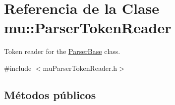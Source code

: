 \hypertarget{classmu_1_1_parser_token_reader}{}\section{Referencia de la Clase mu\+:\+:Parser\+Token\+Reader}
\label{classmu_1_1_parser_token_reader}


Token reader for the \hyperlink{classmu_1_1_parser_base}{Parser\+Base} class.  




{\ttfamily \#include $<$mu\+Parser\+Token\+Reader.\+h$>$}

\subsection*{Métodos públicos}
